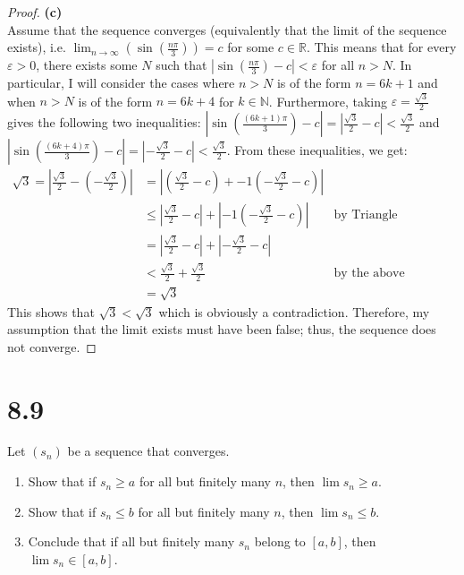 \documentclass[10pt,a4paper]{article}
\theoremstyle{definition}
\begin{document}
\begin{proof}{\textbf{(c)}}
\\Assume that the sequence converges (equivalently that the limit of the sequence exists), i.e. $\displaystyle \lim_{n \to \infty} \left(\sin\left(\frac{n\pi}{3}\right)\right) = c$ for some $c \in \mathbb{R}$. This means that for every $\varepsilon > 0$, there exists some $N$ such that $\displaystyle \left|\sin\left(\frac{n\pi}{3}\right) - c\right| < \varepsilon$ for all $n > N$. In particular, I will consider the cases where $n > N$ is of the form $n = 6k + 1$ and when $n > N$ is of the form $n = 6k + 4$ for $k \in \mathbb{N}$. Furthermore, taking $\varepsilon = \frac{\sqrt{3}}{2}$ gives the following two inequalities: $|\sin(\frac{(6k + 1)\pi}{3}) - c| = |\frac{\sqrt{3}}{2} - c| < \frac{\sqrt{3}}{2}$ and $|\sin(\frac{(6k + 4)\pi}{3}) - c| = |-\frac{\sqrt{3}}{2} - c| < \frac{\sqrt{3}}{2}$. From these inequalities, we get:
\begin{align*}
\sqrt{3} = \left|\frac{\sqrt{3}}{2} - \left(-\frac{\sqrt{3}}{2}\right)\right| &= \left|\left(\frac{\sqrt{3}}{2} - c\right) + -1\left(-\frac{\sqrt{3}}{2} - c\right)\right|\\
&\leq \left|\frac{\sqrt{3}}{2} - c\right| + \left|-1\left(-\frac{\sqrt{3}}{2} - c\right)\right| &\text{by Triangle Inequality}\\
&= \left|\frac{\sqrt{3}}{2} - c\right| + \left|-\frac{\sqrt{3}}{2} - c\right|\\
&< \frac{\sqrt{3}}{2} + \frac{\sqrt{3}}{2} &\text{by the above inequalities}\\
&= \sqrt{3}
\end{align*}
This shows that $\sqrt{3} < \sqrt{3}$ which is obviously a contradiction. Therefore, my assumption that the limit exists must have been false; thus, the sequence does not converge. 
\end{proof}

\section*{8.9}
Let $(s_n)$ be a sequence that converges.
\begin{enumerate}[label = (\alph*)]
\item Show that if $s_n \geq a$ for all but finitely many $n$, then $\lim s_n \geq a$.
\item Show that if $s_n \leq b$ for all but finitely many $n$, then $\lim s_n \leq b$.
\item Conclude that if all but finitely many $s_n$ belong to $[a,b]$, then $\lim s_n \in [a,b]$.
\end{enumerate}
\end{document}
